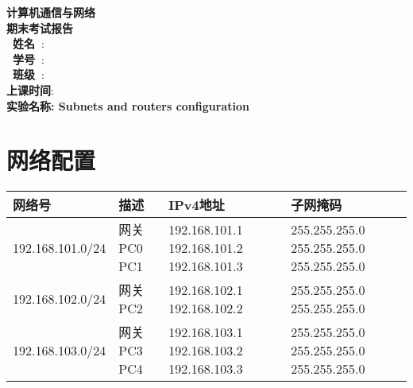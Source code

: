 \documentclass[a4paper]{ctexart}
\begin{document}
  \begin{titlepage}
      \songti
      \begin{center}
        \vspace*{2cm}
        {\fontsize{24pt}{0}
          \textbf{计算机通信与网络\\期末考试报告\\}
        }
        \vspace*{10cm}
        {\fontsize{16pt}{0}
          \textbf{\ 姓\quad 名\ }: \underline{}\\
          \textbf{\ 学\quad 号\ }: \underline{}\\
          \textbf{\ 班\quad 级\ }: \underline{}\\
          \textbf{上课时间}: \underline{}\\
        }
        \vspace*{7cm}
        {\fontsize{16pt}{0}
          \textbf{实验名称: {\Large Subnets and routers configuration}}
        }
      \end{center}
  \end{titlepage}


  \newpage
  \section*{网络配置}
  \begin{center}
    \begin{tabular}{|m{3cm}|m{1cm}|m{2.5cm}|m{2.5cm}|}
      \hline
      网络号 & 描述 & IPv4地址 & 子网掩码\\
      \hline
      192.168.101.0/24 & 网关 PC0 PC1 & 192.168.101.1 192.168.101.2 192.168.101.3 & 255.255.255.0 255.255.255.0 255.255.255.0\\
      \hline
      192.168.102.0/24 & 网关 PC2 & 192.168.102.1 192.168.102.2 & 255.255.255.0 255.255.255.0\\
      \hline
      192.168.103.0/24 & 网关 PC3 PC4 & 192.168.103.1 192.168.103.2 192.168.103.3 & 255.255.255.0 255.255.255.0 255.255.255.0\\
      \hline
    \end{tabular}
  \end{center}
\end{document}
